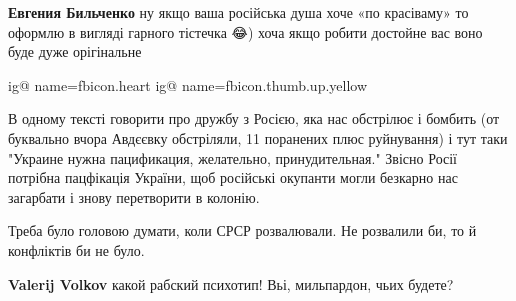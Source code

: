 \begin{itemize}
\begin{itemize}
 
\textbf{Евгения Бильченко} ну якщо ваша російська душа хоче «по красіваму» то
оформлю в вигляді гарного тістечка 😂) хоча якщо робити достойне вас воно буде
дуже орігінальне🙈💩💩💩
\end{itemize}

 

\ifcmt
  ig@ name=fbicon.heart
  ig@ name=fbicon.thumb.up.yellow
\fi

 

В одному тексті говорити про дружбу з Росією, яка нас обстрілює і бомбить (от
буквально вчора Авдєєвку обстріляли, 11 поранених плюс руйнування) і тут таки
"Украине нужна пацификация, желательно, принудительная." Звісно Росії потрібна
пацфікація України, щоб російські окупанти могли безкарно нас загарбати і знову
перетворити в колонію.

\begin{itemize}
 
Треба було головою думати, коли СРСР розвалювали.
Не розвалили би, то й конфліктів би не було.

 
\textbf{Valerij Volkov} какой рабский психотип! Вьі, мильпардон, чьих будете?

 

\end{itemize}
\end{itemize}
